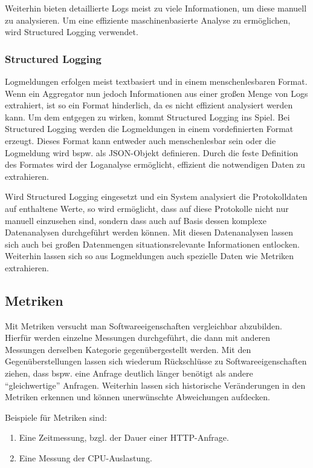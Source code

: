 Weiterhin bieten detaillierte Logs meist zu viele Informationen, um diese manuell zu analysieren. Um eine effiziente maschinenbasierte Analyse zu ermöglichen, wird Structured Logging verwendet.

\subsubsection{Structured Logging}

Logmeldungen erfolgen meist textbasiert und in einem menschenlesbaren Format. Wenn ein Aggregator nun jedoch Informationen aus einer großen Menge von Logs extrahiert, ist so ein Format hinderlich, da es nicht effizient analysiert werden kann. Um dem entgegen zu wirken, kommt Structured Logging ins Spiel. Bei Structured Logging werden die Logmeldungen in einem vordefinierten Format erzeugt. Dieses Format kann entweder auch menschenlesbar sein oder die Logmeldung wird bspw. als JSON-Objekt definieren. Durch die feste Definition des Formates wird der Loganalyse ermöglicht, effizient die notwendigen Daten zu extrahieren.

Wird Structured Logging eingesetzt und ein System analysiert die Protokolldaten auf enthaltene Werte, so wird ermöglicht, dass auf diese Protokolle nicht nur manuell einzusehen sind, sondern dass auch auf Basis dessen komplexe Datenanalysen durchgeführt werden können. Mit diesen Datenanalysen lassen sich auch bei großen Datenmengen situationsrelevante Informationen entlocken. Weiterhin lassen sich so aus Logmeldungen auch spezielle Daten wie Metriken extrahieren.

\subsection{Metriken}

Mit Metriken versucht man Softwareeigenschaften vergleichbar abzubilden. Hierfür werden einzelne Messungen durchgeführt, die dann mit anderen Messungen derselben Kategorie gegenübergestellt werden. Mit den Gegenüberstellungen lassen sich wiederum Rückschlüsse zu Softwareeigenschaften ziehen, dass bspw. eine Anfrage deutlich länger benötigt als andere \enquote{gleichwertige} Anfragen. Weiterhin lassen sich historische Veränderungen in den Metriken erkennen und können unerwünschte Abweichungen aufdecken.

Beispiele für Metriken sind:

\begin{enumerate}
	\item Eine Zeitmessung, bzgl. der Dauer einer HTTP-Anfrage.
	\item Eine Messung der CPU-Auslastung.
\end{enumerate}


